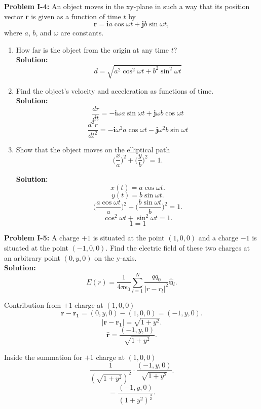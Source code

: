 \documentclass[11pt]{article}
\begin{document}
\textbf{Problem I-4:}
An object moves in the xy-plane in such a way that its position vector \textbf{r} is given as a function of time $t$ by 
\[
	\mathbf{r} = \mathbf{i}a\cos \omega t + \mathbf{j}b \sin \omega t
,\] 
where $a$, $b$, and $\omega$ are constants.

\begin{enumerate}[label= \textbf{\Alph*.}]
	\item How far is the object from the origin at any time $t$?\\

		\textbf{Solution:}
		\[
			\boxed{d = \sqrt{a^2\cos^2{\omega t} + b^2\sin^2{\omega t}}} 
		\] 

	\item Find the object's velocity and acceleration as functions of time.\\

		\textbf{Solution:}
		\[
			\boxed{\frac{dr}{dt} = -\mathbf{i} \omega a \sin{\omega t} + \mathbf{j} \omega b \cos{\omega t}}
		\]
		\[
			\boxed{\frac{d^2r}{dt^2} = -\mathbf{i}\omega^2a\cos{\omega t} - \mathbf{j}\omega^2b\sin{\omega t}}
		\]
	\item Show that the object moves on the elliptical path
		\[
		\biggl (\frac{x}{a} \biggr)^2 + \biggl(\frac{y}{b} \biggr)^2 = 1
		.\] 

		\textbf{Solution:}
		\[
			x(t) = a\cos{\omega t}
		.\] 
		\[
		y(t) = b\sin{\omega t}
		.\] 
		\[
			\biggl(\frac{a\cos \omega t}{a}\biggr)^2 + \biggl(\frac{b\sin \omega t}{b}\biggr)^2 = 1
		.\] 
		\[
		\cos^2 \omega t + \sin^2 \omega t = 1
		.\] 
		\[
			\boxed{1 = 1}
		\] 
\end{enumerate}

\textbf{Problem I-5:} A charge $+1$ is situated at the point $(1,0,0)$ and a charge $-1$ is situated at the point $(-1,0,0)$. Find the electric field of these two charges at an arbitrary point $(0,y,0)$ on the y-axis.\\

		\textbf{Solution:}
		\[
			E(r) = \frac{1}{4\pi \epsilon_0} \sum_{l=1}^{N}\frac{q q_0}{|r-r_l|^2}\mathbf{\hat{u}}_l
		.\]

		Contribution from $+1$ charge at $(1,0,0)$
		 \[
		 \mathbf{r} - \mathbf{r_1} = (0,y,0) - (1,0,0) = (-1,y,0).\] 
		\[
			|\mathbf{r} - \mathbf{r_1}| =  \sqrt{1 + y^2}
		.\]
		\[
			\mathbf{\hat{r}} = \frac{(-1,y,0)}{\sqrt{1 + y^2}}
		.\]

		Inside the summation for $+1$ charge at  $(1,0,0)$
		\[
		\frac{1}{(\sqrt{1 + y^2})^2} \cdot \frac{(-1,y,0)}{\sqrt{1+y^2}}
		.\] 
		\[
		= \frac{(-1,y,0)}{(1+y^2)^{\frac{3}{2}}}
		.\]
\end{document}
